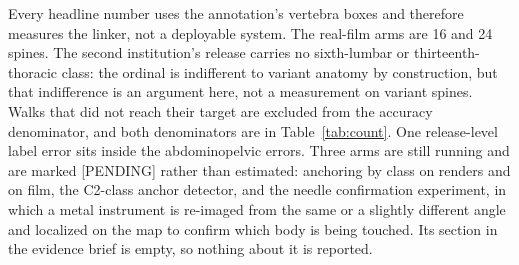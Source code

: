 \documentclass[11pt,letterpaper]{article}
\begin{document}
Every headline number uses the annotation's vertebra boxes and therefore measures the linker, not a
deployable system. The real-film arms are 16 and 24 spines. The second institution's release carries no
sixth-lumbar or thirteenth-thoracic class: the ordinal is indifferent to variant anatomy by construction,
but that indifference is an argument here, not a measurement on variant spines. Walks that did not reach
their target are excluded from the accuracy denominator, and both denominators are in
Table~\ref{tab:count}. One release-level label error sits inside the abdominopelvic errors. Three arms are still running and are marked [PENDING] rather than
estimated: anchoring by class on renders and on film, the C2-class anchor detector, and the needle
confirmation experiment, in which a metal instrument is re-imaged from the same or a slightly different
angle and localized on the map to confirm which body is being touched. Its section in the evidence brief
is empty, so nothing about it is reported.
\end{document}
